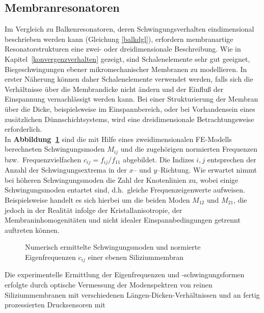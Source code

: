 \subsection{Membranresonatoren}
\label{membranresonatoren}

Im Vergleich zu Balkenresonatoren, deren Schwingungsverhalten eindimensional
beschrieben werden kann (Gleichung \ref{balkdgl}), erfordern membranartige
Resonatorstrukturen eine zwei- oder dreidimensionale Beschreibung.
Wie in Kapitel~\ref{konvergenzverhalten} gezeigt, sind Schalenelemente
sehr gut geeignet, Biegeschwingungen ebener mikromechanischer Membranen
zu modellieren. In erster Näherung können daher Schalenelemente verwendet
werden, falls sich die Verhältnisse
über die Membrandicke nicht ändern und der Einfluß der Einspannung
vernachlässigt werden kann. Bei einer Strukturierung der Membran über
die Dicke, beispielsweise im Einspannbereich, oder bei Vorhandensein eines
zusätzlichen Dünnschichtsystems, wird eine dreidimensionale
Betrachtungsweise erforderlich.\\
In {\bf Abbildung~\ref{abbmembranmoden}} sind die mit Hilfe eines
zweidimensionalen FE-Modells berechneten Schwingungsmoden
$M_{ij}$ und die zugehörigen normierten Frequenzen bzw.\ Frequenzvielfachen
$c_{ij} = f_{ij} / f_{11}$ abgebildet. Die Indizes $i, j$ entsprechen der
Anzahl der Schwingungsextrema in der $x$-- und $y$--Richtung.
Wie erwartet nimmt bei höheren Schwingungsmoden die Zahl der Knotenlinien
zu, wobei einige Schwingungsmoden entartet sind, d.h.\
gleiche Frequenzeigenwerte aufweisen. Beispielsweise handelt es sich
hierbei um die beiden
Moden $M_{12}$ und $M_{21}$, die jedoch in der Realität infolge der
Kristallanisotropie, der Membraninhomogenitäten und nicht idealer
Einspannbedingungen getrennt auftreten können.
\begin{figure}[htb]
\begin{center}

\setabbvv
\end{center}
\caption{\label{abbmembranmoden}
 Numerisch ermittelte Schwingungsmoden und normierte Eigenfrequenzen
 $c_{ij}$ einer ebenen Siliziummembran}
\end{figure}
Die experimentelle Ermittlung der Eigenfrequenzen und -schwingungsformen
erfolgte durch optische Vermessung der Modenspektren von reinen
Siliziummembranen mit verschiedenen Längen-Dicken-Verhältnissen
\cite{Sch92, Bra92a} und an fertig prozessierten Drucksensoren mit
